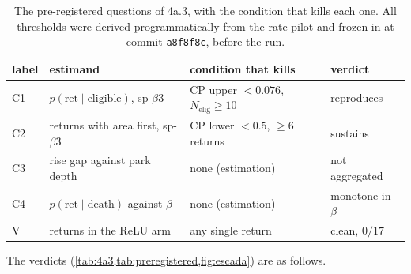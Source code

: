 \documentclass[11pt]{article}
\theoremstyle{definition}
\theoremstyle{remark}
\begin{document}
\begin{table}[t]
\centering
\caption{The pre-registered questions of 4a.3, with the condition that kills each
one. All thresholds were derived programmatically from the rate pilot and frozen
in \protect{} at commit \texttt{a8f8f8c}, before the run.}
\label{tab:preregistered}
\small
\begin{tabular}{@{}llll@{}}
\toprule
label & estimand & condition that kills & verdict \\
\midrule
C1 & $p(\mathrm{ret}\mid\mathrm{eligible})$, sp-$\beta3$
   & CP upper $<0.076$, $N_{\mathrm{elig}}\ge10$ & reproduces \\
C2 & returns with area first, sp-$\beta3$
   & CP lower $<0.5$, $\ge6$ returns & sustains \\
C3 & rise gap against park depth
   & none (estimation) & not aggregated \\
C4 & $p(\mathrm{ret}\mid\mathrm{death})$ against $\beta$
   & none (estimation) & monotone in $\beta$ \\
V  & returns in the ReLU arm
   & any single return & clean, $0/17$ \\
\bottomrule
\end{tabular}
\end{table}

The verdicts (\cref{tab:4a3,tab:preregistered,fig:escada}) are as follows.
\end{document}
